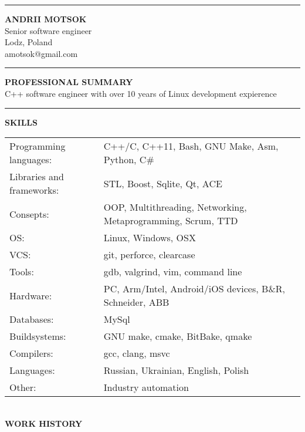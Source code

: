 \documentclass{article}
\begin{document}
\noindent\hrule height 5pt \vspace{4mm} \noindent
{\selectfont\huge{\textbf{ANDRII MOTSOK}}} \\
{\color{lightgray}Senior software engineer\\Lodz, Poland}\\
{\color{cyan}amotsok@gmail.com}\\
{\color{lightgray}\hrule height 0.2mm}
\vspace{2mm}
\noindent
\textbf{PROFESSIONAL SUMMARY}\\
C++ software engineer with over 10 years of Linux development expierence\\
{\color{lightgray}\hrule height 0.2mm} \vspace{2mm}
\noindent
\textbf{SKILLS}\\
\noindent\begin{tabular}{@{}ll}
  Programming languages: & C++/C, C++11, Bash, GNU Make, Asm, Python, C\# \\
  Libraries and frameworks: & STL, Boost, Sqlite, Qt, ACE\\
  Consepts: & OOP, Multithreading, Networking, Metaprogramming, Scrum, TTD\\
  OS: & Linux, Windows, OSX\\
  VCS: & git, perforce, clearcase\\
  Tools: & gdb, valgrind, vim, command line\\
  Hardware: & PC, Arm/Intel, Android/iOS devices, B\&R, Schneider, ABB\\
  Databases: &MySql\\
  Buildsystems: &GNU make, cmake, BitBake, qmake\\
  Compilers: &gcc, clang, msvc\\
  Languages: &Russian, Ukrainian, English, Polish\\
  Other: &  Industry automation\\
\end{tabular}\\
\vspace{2mm}
\noindent \textbf{WORK HISTORY}\\[2mm]
\end{document}

